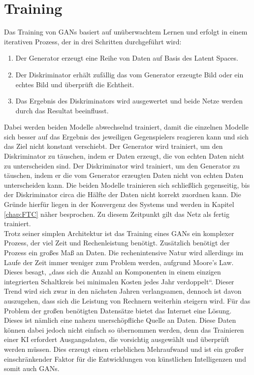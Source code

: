 \section{Training}

\noindent Das Training von \acp{GAN} basiert auf unüberwachtem Lernen und erfolgt in einem iterativen Prozess, der in drei Schritten durchgeführt wird: \\
\begin{enumerate}
    \item Der Generator erzeugt eine Reihe von Daten auf Basis des Latent Spaces.
    \item Der Diskriminator erhält zufällig das vom Generator erzeugte Bild oder ein echtes Bild und überprüft die Echtheit.
    \item Das Ergebnis des Diskriminators wird ausgewertet und beide Netze werden durch das Resultat beeinflusst. \\
\end{enumerate}

\noindent Dabei werden beiden Modelle abwechselnd trainiert, damit die einzelnen Modelle sich besser auf das Ergebnis des jeweiligen Gegenspielers reagieren kann und sich das Ziel nicht konstant verschiebt. Der Generator wird trainiert, um den Diskriminator zu täuschen, indem er Daten erzeugt, die von echten Daten nicht zu unterscheiden sind. Der Diskriminator wird trainiert, um den Generator zu täuschen, indem er die vom Generator erzeugten Daten nicht von echten Daten unterscheiden kann. Die beiden Modelle trainieren sich schließlich gegenseitig, bis der Diskriminator circa die Hälfte der Daten nicht korrekt zuordnen kann. Die Gründe hierfür liegen in der Konvergenz des Systems und werden in Kapitel \ref{chap:FTC} näher besprochen. Zu diesem Zeitpunkt gilt das Netz als fertig trainiert. \cite{training} \\

\noindent Trotz seiner simplen Architektur ist das Training eines \acp{GAN} ein komplexer Prozess, der viel Zeit und Rechenleistung benötigt. Zusätzlich benötigt der Prozess ein großes Maß an Daten. Die rechenintensive Natur wird allerdings im Laufe der Zeit immer weniger zum Problem werden, aufgrund Moore's Law. Dieses besagt, „dass sich die Anzahl an Komponenten in einem einzigen integrierten Schaltkreis bei minimalen Kosten jedes Jahr verdoppelt“. \cite{moore} Dieser Trend wird sich zwar in den nächsten Jahren verlangsamen, dennoch ist davon auszugehen, dass sich die Leistung von Rechnern weiterhin steigern wird. Für das Problem der großen benötigten Datensätze bietet das Internet eine Lösung. Dieses ist nämlich eine nahezu unerschöpfliche Quelle an Daten. Diese Daten können dabei jedoch nicht einfach so übernommen werden, denn das Trainieren einer KI erfordert Ausgangsdaten, die vorsichtig ausgewählt und überprüft werden müssen. Dies erzeugt einen erheblichen Mehraufwand und ist ein großer einschränkender Faktor für die Entwicklungen von künstlichen Intelligenzen und somit auch \acp{GAN}.
\newpage